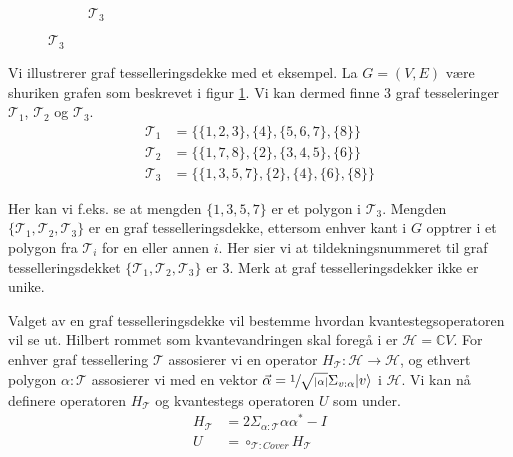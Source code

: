 \begin{figure}
\begin{center}
\begin{tcolorbox}
\begin{subfigure}{0.32\textwidth}
\begin{tikzpicture}[main/.style={draw,circle}, scale=0.75]
                        \end{tikzpicture}
                        \caption{$\mathcal{T}_3$}
                    \end{subfigure}
                \end{tcolorbox}
            \end{center}
            \label{fig:shuriken}
        \end{figure}

        Vi illustrerer graf tesselleringsdekke med et eksempel. La $G=(V,E)$ være shuriken grafen som beskrevet i figur \ref{fig:shuriken}. Vi kan dermed finne $3$ graf tesseleringer $\mathcal{T}_1$, $\mathcal{T}_2$ og $\mathcal{T}_3$.
        \begin{align*}
            \mathcal{T}_1 & = \{\{1,2,3\},\{4\},\{5,6,7\},\{8\}\} \\
            \mathcal{T}_2 & = \{\{1,7,8\},\{2\},\{3,4,5\},\{6\}\} \\
            \mathcal{T}_3 & = \{\{1,3,5,7\},\{2\},\{4\},\{6\},\{8\}\}
        \end{align*}

        Her kan vi f.eks. se at mengden $\{1,3,5,7\}$ er et polygon i $\mathcal{T}_3$. Mengden $\{\mathcal{T}_1, \mathcal{T}_2, \mathcal{T}_3\}$ er en graf tesselleringsdekke, ettersom enhver kant i $G$ opptrer i et polygon fra $\mathcal{T}_i$ for en eller annen $i$. Her sier vi at tildekningsnummeret til graf tesselleringsdekket $\{\mathcal{T}_1, \mathcal{T}_2, \mathcal{T}_3\}$ er $3$. Merk at graf tesselleringsdekker ikke er unike.

        Valget av en graf tesselleringsdekke vil bestemme hvordan kvantestegsoperatoren vil se ut. Hilbert rommet som kvantevandringen skal foregå i er $\mathcal{H}=\mathbb{C}V$. For enhver graf tessellering $\mathcal{T}$ assosierer vi en operator $H_{\mathcal{T}}:\mathcal{H}\rightarrow\mathcal{H}$, og ethvert polygon $\alpha:\mathcal{T}$ assosierer vi med en vektor $\vec{\alpha}=\sfrac{1}{\sqrt{|\alpha|}}\Sigma_{v:\alpha}|v\rangle$ i $\mathcal{H}$. Vi kan nå definere operatoren $H_\mathcal{T}$ og kvantestegs operatoren $U$ som under.
        \begin{align*}
            H_\mathcal{T} & =2\Sigma_{\alpha:\mathcal{T}}\alpha\alpha^* - I \\
            U & = \circ_{\mathcal{T}:Cover}H_\mathcal{T}
        \end{align*}

